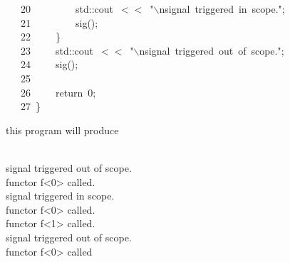 \documentclass[9pt,onside,a4paper]{article}
\newcommand{\hlstd}[1]{\textcolor[rgb]{0.2,0,0.4}{#1}}
\newcommand{\hlnum}[1]{\textcolor[rgb]{0.2,0.73,0.02}{#1}}
\newcommand{\hlesc}[1]{\textcolor[rgb]{0.65,0.09,0.38}{#1}}
\newcommand{\hlstr}[1]{\textcolor[rgb]{0.09,0.38,0.65}{#1}}
\newcommand{\hlopt}[1]{\textcolor[rgb]{0.33,0.33,0.33}{#1}}
\newcommand{\hllin}[1]{\textcolor[rgb]{0.6,0.6,0.6}{#1}}
\newcommand{\hlkwa}[1]{\textcolor[rgb]{1,0.19,0.19}{#1}}
\newcommand{\hlkwd}[1]{\textcolor[rgb]{0.82,0.11,0.93}{#1}}
\begin{document}
\hllin{\ \ \ 20\ }\hlstd{}\hlstd{\ \ \ \ \ \ \ \ }\hlstd{std}\hlopt{::}\hlstd{cout\ }\hlopt{$<$$<$\ }\hlstd{}\hlstr{"}\hlesc{$\backslash$n}\hlstr{signal\ triggered\ in\ scope."}\hlstd{}\hlopt{;}\\
\hllin{\ \ \ 21\ }\hlstd{}\hlstd{\ \ \ \ \ \ \ \ }\hlstd{}\hlkwd{sig}\hlstd{}\hlopt{();}\\
\hllin{\ \ \ 22\ }\hlstd{}\hlstd{\ \ \ \ }\hlstd{}\hlopt{\}}\\
\hllin{\ \ \ 23\ }\hlstd{}\hlstd{\ \ \ \ }\hlstd{std}\hlopt{::}\hlstd{cout\ }\hlopt{$<$$<$\ }\hlstd{}\hlstr{"}\hlesc{$\backslash$n}\hlstr{signal\ triggered\ out\ of\ scope."}\hlstd{}\hlopt{;}\\
\hllin{\ \ \ 24\ }\hlstd{}\hlstd{\ \ \ \ }\hlstd{}\hlkwd{sig}\hlstd{}\hlopt{();}\\
\hllin{\ \ \ 25\ }\hlstd{\\
\hllin{\ \ \ 26\ }}\hlstd{\ \ \ \ }\hlstd{}\hlkwa{return\ }\hlstd{}\hlnum{0}\hlstd{}\hlopt{;}\\
\hllin{\ \ \ 27\ }\hlstd{}\hlopt{\}}\hlstd{}\\
\mbox{}
\normalfont
\normalsize

this program will produce 
\begin{shaded}
{\small
\ttfamily
~\\
signal triggered out of scope. \\
functor f<0> called. \\
signal triggered in scope. \\
functor f<0> called. \\
functor f<1> called. \\
signal triggered out of scope. \\
functor f<0> called 
\normalfont
}
\end{shaded}
\end{document}
